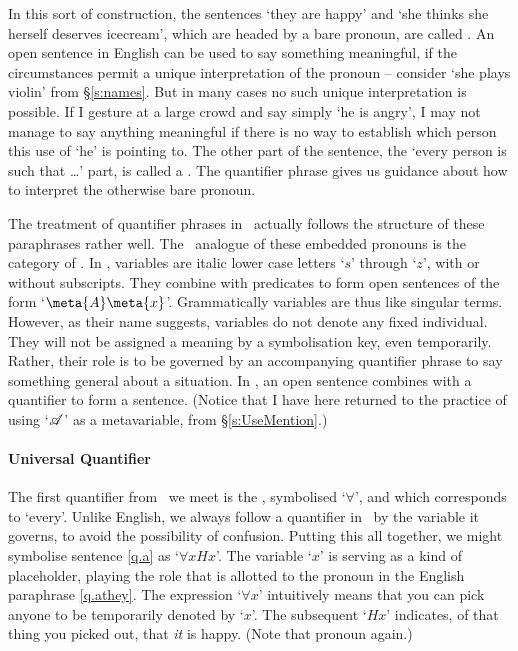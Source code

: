 In this sort of construction, the sentences `they are happy' and `she thinks she herself deserves icecream', which are headed by a bare pronoun, are called . An open sentence in English can be used to say something meaningful, if the circumstances permit a unique interpretation of the pronoun – consider `she plays violin' from §\ref{s:names}. But in many cases no such unique interpretation is possible. If I gesture at a large crowd and say simply `he is angry', I may not manage to say anything meaningful if there is no way to establish which person this use of `he' is pointing to. The other part of the sentence, the `every person is such that …' part, is called a . The quantifier phrase gives us guidance about how to interpret the otherwise bare pronoun. 

The treatment of quantifier phrases in \FOL\ actually follows the structure of these paraphrases rather well. The \FOL\ analogue of these embedded pronouns is the category of . In \FOL, variables are italic lower case letters `$s$' through `$z$', with or without subscripts. They combine with predicates to form open sentences of the form `$\meta{A}\meta{x}$'. Grammatically variables are thus like singular terms. However, as their name suggests, variables do not denote any fixed individual. They will not be assigned a meaning by a symbolisation key, even temporarily. Rather, their role is to be governed by an accompanying quantifier phrase to say something general about a situation. In \FOL, an open sentence combines with a quantifier to form a sentence. (Notice that I have here returned to the practice of using `$\mathscr{A}$' as a metavariable, from §\ref{s:UseMention}.)

\paragraph{Universal Quantifier} The first quantifier from \FOL\ we meet is the , symbolised `$\forall$', and which corresponds to `every'. Unlike English, we always follow a quantifier in \FOL\ by the variable it governs, to avoid the possibility of confusion. Putting this all together, we might symbolise sentence \ref{q.a} as `$\forall x Hx$'.  The variable `$x$' is serving as a kind of placeholder, playing the role that is allotted to the pronoun in the English paraphrase \ref{q.athey}. The expression `$\forall x$' intuitively means that you can pick anyone to be temporarily denoted by `$x$'. The subsequent `$Hx$' indicates, of that thing you picked out, that \emph{it} is happy. (Note that pronoun again.)

